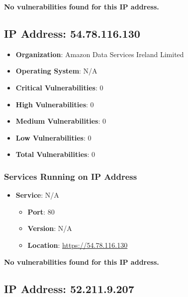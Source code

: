 \documentclass{article}
\begin{document}
\textbf{No vulnerabilities found for this IP address.}




\clearpage



\subsection*{IP Address: 54.78.116.130}

\begin{itemize}
    \item \textbf{Organization}: Amazon Data Services Ireland Limited
    \item \textbf{Operating System}:  N/A 
    \item \textbf{Critical Vulnerabilities}: 0
    \item \textbf{High Vulnerabilities}: 0
    \item \textbf{Medium Vulnerabilities}: 0
    \item \textbf{Low Vulnerabilities}: 0
    \item \textbf{Total Vulnerabilities}: 0
\end{itemize}

\subsubsection*{Services Running on IP Address}

\begin{itemize}
    
        \item \textbf{Service}: N/A
        \begin{itemize}
            \item \textbf{Port}: 80
            \item \textbf{Version}:  N/A 
            \item \textbf{Location}: \href{ https://54.78.116.130 }{ https://54.78.116.130 }
        \end{itemize}
    
\end{itemize}


\textbf{No vulnerabilities found for this IP address.}




\clearpage



\subsection*{IP Address: 52.211.9.207}
\end{document}
